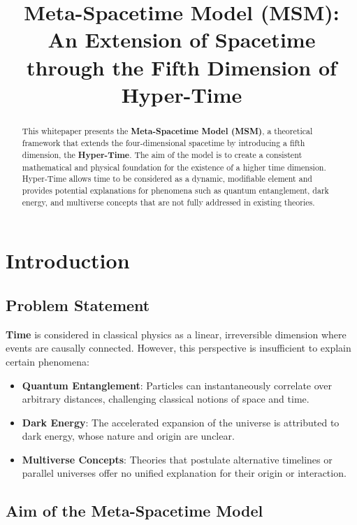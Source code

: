 \documentclass[11pt,a4paper]{article}
\title{\textbf{Meta-Spacetime Model (MSM):\\An Extension of Spacetime through the Fifth Dimension of Hyper-Time}}
\author{}
\date{}
\begin{document}
\maketitle

\begin{abstract}
This whitepaper presents the \textbf{Meta-Spacetime Model (MSM)}, a theoretical framework that extends the four-dimensional spacetime by introducing a fifth dimension, the \textbf{Hyper-Time}. The aim of the model is to create a consistent mathematical and physical foundation for the existence of a higher time dimension. Hyper-Time allows time to be considered as a dynamic, modifiable element and provides potential explanations for phenomena such as quantum entanglement, dark energy, and multiverse concepts that are not fully addressed in existing theories.
\end{abstract}

\tableofcontents
\newpage

\section{Introduction}

\subsection{Problem Statement}

\textbf{Time} is considered in classical physics as a linear, irreversible dimension where events are causally connected. However, this perspective is insufficient to explain certain phenomena:

\begin{itemize}
    \item \textbf{Quantum Entanglement}: Particles can instantaneously correlate over arbitrary distances, challenging classical notions of space and time.
    \item \textbf{Dark Energy}: The accelerated expansion of the universe is attributed to dark energy, whose nature and origin are unclear.
    \item \textbf{Multiverse Concepts}: Theories that postulate alternative timelines or parallel universes offer no unified explanation for their origin or interaction.
\end{itemize}

\subsection{Aim of the Meta-Spacetime Model}
\end{document}
